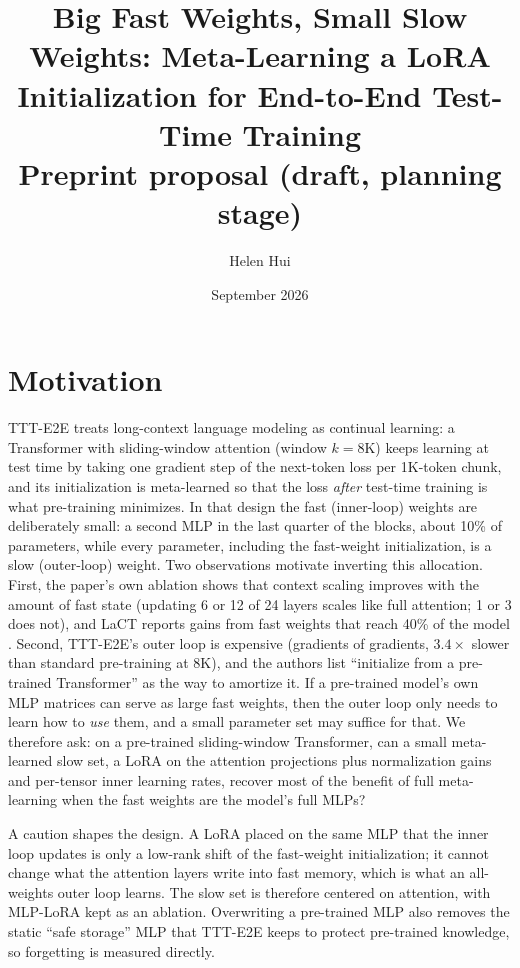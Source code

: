 \documentclass[10pt]{article}
\title{Big Fast Weights, Small Slow Weights: Meta-Learning a LoRA Initialization for End-to-End Test-Time Training \\ \large Preprint proposal (draft, planning stage)}
\author{Helen Hui}
\date{September 2026}
\begin{document}
\maketitle

\section{Motivation}
TTT-E2E \citep{tandon2025e2e} treats long-context language modeling as continual learning: a Transformer with sliding-window attention (window $k{=}8$K) keeps learning at test time by taking one gradient step of the next-token loss per 1K-token chunk, and its initialization is meta-learned so that the loss \emph{after} test-time training is what pre-training minimizes. In that design the fast (inner-loop) weights are deliberately small: a second MLP in the last quarter of the blocks, about 10\% of parameters, while every parameter, including the fast-weight initialization, is a slow (outer-loop) weight. Two observations motivate inverting this allocation. First, the paper's own ablation shows that context scaling improves with the amount of fast state (updating 6 or 12 of 24 layers scales like full attention; 1 or 3 does not), and LaCT reports gains from fast weights that reach 40\% of the model \citep{zhang2025lact}. Second, TTT-E2E's outer loop is expensive (gradients of gradients, $3.4\times$ slower than standard pre-training at 8K), and the authors list ``initialize from a pre-trained Transformer'' as the way to amortize it. If a pre-trained model's own MLP matrices can serve as large fast weights, then the outer loop only needs to learn how to \emph{use} them, and a small parameter set may suffice for that. We therefore ask: on a pre-trained sliding-window Transformer, can a small meta-learned slow set, a LoRA on the attention projections \citep{hu2022lora} plus normalization gains and per-tensor inner learning rates, recover most of the benefit of full meta-learning when the fast weights are the model's full MLPs?

A caution shapes the design. A LoRA placed on the same MLP that the inner loop updates is only a low-rank shift of the fast-weight initialization; it cannot change what the attention layers write into fast memory, which is what an all-weights outer loop learns. The slow set is therefore centered on attention, with MLP-LoRA kept as an ablation. Overwriting a pre-trained MLP also removes the static ``safe storage'' MLP that TTT-E2E keeps to protect pre-trained knowledge, so forgetting is measured directly.
\end{document}
